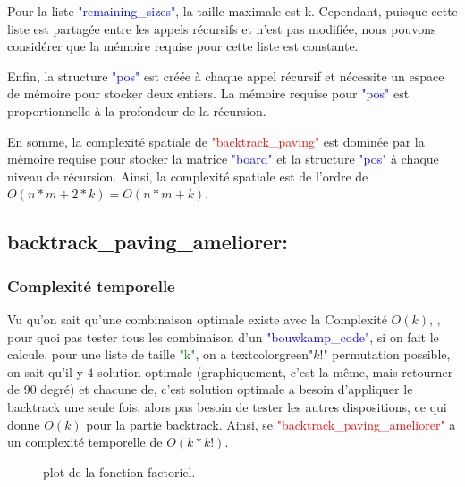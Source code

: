 \documentclass{article}
\begin{document}
Pour la liste \textcolor{blue}{"remaining\_sizes"}, la taille maximale est k. Cependant, puisque cette liste est partagée entre les appels récursifs et n'est pas modifiée, nous pouvons considérer que la mémoire requise pour cette liste est constante.\newline

Enfin, la structure \textcolor{blue}{"pos"} est créée à chaque appel récursif et nécessite un espace de mémoire pour stocker deux entiers. La mémoire requise pour \textcolor{blue}{"pos"} est proportionnelle à la profondeur de la récursion.\newline

En somme, la complexité spatiale de \textcolor{red}{"backtrack\_paving"} est dominée par la mémoire requise pour stocker la matrice \textcolor{blue}{"board"} et la structure \textcolor{blue}{"pos"} à chaque niveau de récursion. Ainsi, la complexité spatiale est de l'ordre de $O(n * m + 2 * k) = O(n * m + k)$.

\subsection{ backtrack\_paving\_ameliorer:}
\label{Complexité3}
\subsubsection{Complexité temporelle}
Vu qu'on sait qu'une combinaison optimale existe avec la Complexité $O(k)$, , pour quoi pas tester tous les combinaison d'un \textcolor{blue}{"bouwkamp\_code"}, si on fait le calcule, pour une liste de taille \textcolor{green}{"k"}, on a textcolor{green}{"$k!$"} permutation possible, on sait qu'il y $4$ solution optimale (graphiquement, c'est la même, mais retourner de 90 degré) et chacune de, c'est solution optimale a besoin d'appliquer le backtrack une seule fois, alors pas besoin de tester les autres dispositions, ce qui donne $O(k)$ pour la partie backtrack. Ainsi, se \textcolor{red}{"backtrack\_paving\_ameliorer"} a un complexité temporelle de $O(k*k!)$.\newline

\begin{figure}[htbp]
    \centering
    \caption{plot de la fonction factoriel.}
    \label{fig5}
\end{figure}
\end{document}

